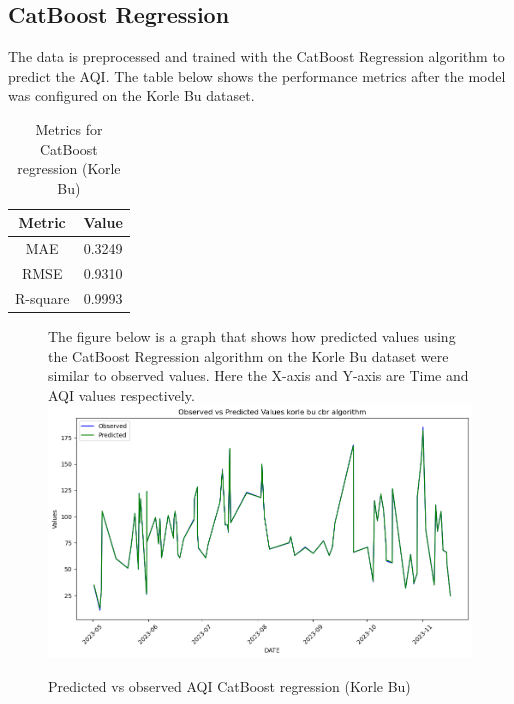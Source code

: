 \documentclass{book}
\numberwithin{equation}{section}
\numberwithin{figure}{section}
\begin{document}
\subsection{CatBoost Regression}
The data is preprocessed and trained with the CatBoost Regression algorithm to predict the AQI. The table below shows the performance metrics after the model was configured on the Korle Bu dataset.
\begin{table}[H]
    \centering
    \begin{tabular}{|c|c|}
        \hline
        \textbf{Metric} & \textbf{Value} \\
        \hline
        MAE & 0.3249 \\
        \hline
        RMSE & 0.9310 \\
        \hline
        R-square & 0.9993\\
        \hline
    \end{tabular}
    \caption{Metrics for CatBoost regression (Korle Bu)}
    \label{tab: CBR metrics(korle Bu)}
\end{table}
\begin{figure}[H]
 \begin{minipage}{\linewidth}
        The figure below is a graph that shows how predicted values using the CatBoost Regression algorithm on the Korle Bu dataset were similar to observed values. Here the X-axis and Y-axis are Time and AQI values respectively.
        \vspace{0.5em} 
        \includegraphics[width=\linewidth]{korle bu cbr.png}
       
        \caption{ Predicted vs observed AQI CatBoost regression (Korle Bu)}
        \label{fig: CBR Predicted vs observed AQI(Korle Bu)}
    \end{minipage}
\end{figure}
\end{document}
